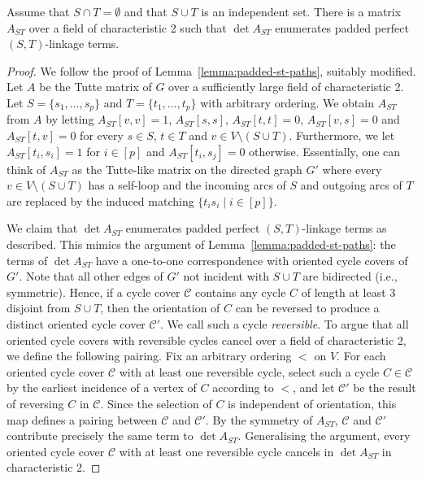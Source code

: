 \documentclass{theoretics}
\newcommand{\cC}{\ensuremath{\mathcal C}\xspace}
\begin{document}
\begin{lemma} \label{lemma:padded-st-linkages}
  Assume that $S \cap T = \emptyset$ and that $S \cup T$ is an
  independent set. 
  There is a matrix $A_{ST}$ over a field of characteristic 2 such
  that $\det A_{ST}$ enumerates padded perfect $(S, T)$-linkage terms.
\end{lemma}
\begin{proof}
  We follow the proof of Lemma~\ref{lemma:padded-st-paths}, suitably modified.
  Let $A$ be the Tutte matrix of $G$ over a sufficiently large field of characteristic 2.
  Let $S=\{s_1,\ldots,s_p\}$ and $T=\{t_1,\ldots,t_p\}$ with arbitrary ordering.
  We obtain $A_{ST}$ from $A$ by
  letting $A_{ST}[v, v] = 1$, $A_{ST}[s,s]$, $A_{ST}[t,t]=0$, $A_{ST}[v, s] = 0$ and $A_{ST}[t, v] = 0$ for every $s \in S$, 
  $t \in T$ and $v \in V \setminus (S \cup T)$. Furthermore,
  we let $A_{ST}[t_i,s_i]=1$ for $i \in [p]$ and $A_{ST}[t_i,s_j]=0$ otherwise. 
  Essentially, one can think of $A_{ST}$ as the Tutte-like matrix on
  the directed graph $G'$ where every $v \in V \setminus (S \cup T)$
  has a self-loop and the incoming arcs of $S$ and outgoing arcs of $T$ are replaced by
  the induced matching $\{t_is_i \mid i \in [p]\}$. 

  We claim that $\det A_{ST}$ enumerates padded perfect $(S, T)$-linkage terms as described.
  This mimics the argument of Lemma~\ref{lemma:padded-st-paths}: the terms of $\det A_{ST}$ have 
  a one-to-one correspondence with oriented cycle covers of $G'$.
  Note that all other edges of $G'$ not incident with $S \cup T$ are bidirected (i.e., symmetric).
  Hence, if a cycle cover $\cC$ contains any cycle $C$ of length at least 3 disjoint from $S \cup T$,
  then the orientation of $C$ can be reversed to produce a distinct oriented cycle cover $\cC'$.
  We call such a cycle \emph{reversible}.
  To argue that all oriented cycle covers with reversible cycles cancel over a field
  of characteristic 2, we define the following pairing. Fix an
  arbitrary ordering $<$ on $V$. For each oriented cycle cover $\cC$ with
  at least one reversible cycle, select such a cycle $C \in \cC$
  by the earliest incidence of a vertex of $C$ according to $<$,
  and let $\cC'$ be the result of reversing $C$ in $\cC$. Since
  the selection of $C$ is independent of orientation, this map defines
  a pairing between $\cC$ and $\cC'$. By the symmetry of $A_{ST}$,
  $\cC$ and $\cC'$ contribute precisely the same term to $\det A_{ST}$.
  Generalising the argument, every oriented cycle cover $\cC$ with at
  least one reversible cycle cancels in $\det A_{ST}$ in characteristic 2. 


\end{proof}
\end{document}
